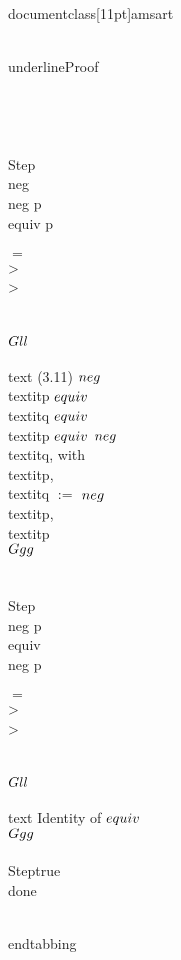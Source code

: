 \\documentclass[11pt]{amsart}
\begin{document}
\\underline{Proof}\\\\\\\\
\\Step{\\neg \\neg p \\equiv p}
\\\\$=$\\>\\>\\ \\ \\ $\\Gll$\\ \\text{ (3.11) $\\neg$\\textit{p} $\\equiv$ \\textit{q} $\\equiv$ \\textit{p} $\\equiv$ $\\neg$\\textit{q}, with \\textit{p}, \\textit{q} $:=$ $\\neg$\\textit{p}, \\textit{p} }\\ $\\Ggg$ \\\\
\\Step{\\neg p \\equiv \\neg p}
\\\\$=$\\>\\>\\ \\ \\ $\\Gll$\\ \\text{ Identity of $\\equiv$ }\\ $\\Ggg$ \\
\\Step{true}
\\done

\\end{tabbing}\
\end{document}
